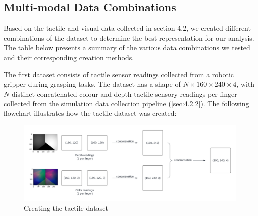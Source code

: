 \documentclass[11pt, a4paper]{report}
\begin{document}
\subsection{Multi-modal Data Combinations}\label{sec:4.4.1}
Based on the tactile and visual data collected in section 4.2, we created different combinations of the dataset to determine the best representation for our analysis. The table below presents a summary of the various data combinations we tested and their corresponding creation methods.
\begin{table}[H]
    \centering
    \caption{Dataset combinations}
    \label{tab:4.1}
\end{table}
The first dataset consists of tactile sensor readings collected from a robotic gripper during grasping tasks. The dataset has a shape of $N\times160\times240\times4$, with $N$ distinct concatenated colour and depth tactile sensory readings per finger collected from the simulation data collection pipeline (\ref{sec:4.2.2}). The following flowchart illustrates how the tactile dataset was created:
\begin{figure}[H]
    \centering
    \includegraphics[width=\textwidth]{docs/Project Report/Media/4_4_1_tactile_dataset_creation.png}
    \caption{Creating the tactile dataset}
    \label{fig:4.7}
\end{figure}
\end{document}
